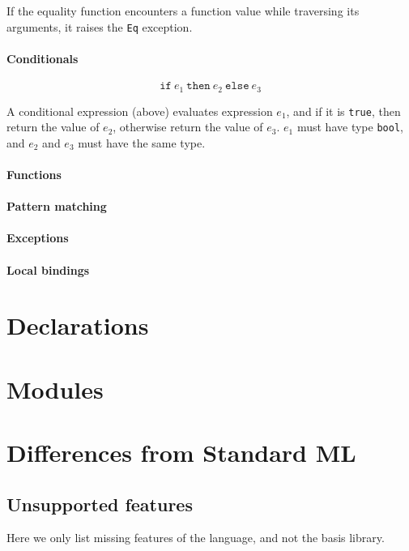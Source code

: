\documentclass[12pt,a4paper]{book}
\begin{document}
If the equality function encounters a function value while traversing its arguments, it raises the \texttt{Eq} exception.

\paragraph{Conditionals}
%
\[\texttt{if}\ e_1\ \texttt{then}\ e_2\ \texttt{else}\ e_3\]

A conditional expression (above) evaluates expression $e_1$, and if it is \texttt{true}, then return the value of $e_2$, otherwise return the value of $e_3$. $e_1$ must have type \texttt{bool}, and $e_2$ and $e_3$ must have the same type.

\paragraph{Functions}

\paragraph{Pattern matching}

\paragraph{Exceptions}

\paragraph{Local bindings}

\section{Declarations}
\label{declarations}

\section{Modules}

\section{Differences from Standard ML}

\subsection{Unsupported features}
Here we only list missing features of the language, and not the basis library.
\end{document}
